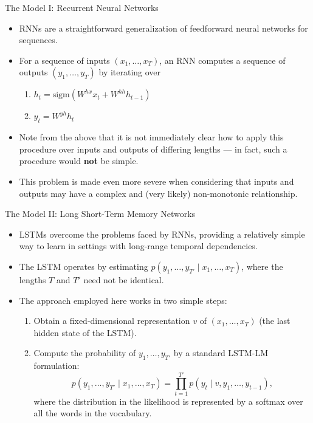 \documentclass{beamer}
\begin{document}

\begin{frame}{The Model I: Recurrent Neural Networks}

\begin{itemize}
  \itemsep10pt
  \item RNNs are a straightforward generalization of feedforward neural networks
    for sequences.
  \item For a sequence of inputs $(x_1, \dots, x_T)$, an RNN computes a sequence
    of outputs $(y_1, \dots, y_T)$ by iterating over
    \begin{enumerate}
      \item $h_t = \text{sigm}(W^{hx}x_t + W^{hh}h_{t-1})$
      \item $y_t = W^{yh}h_t$
    \end{enumerate}
  \item Note from the above that it is not immediately clear how to apply this
    procedure over inputs and outputs of differing lengths --- in fact, such a
    procedure would \textbf{not} be simple.
  \item This problem is made even more severe when considering that inputs and
    outputs may have a complex and (very likely) non-monotonic relationship.
\end{itemize}

\end{frame}


\begin{frame}{The Model II: Long Short-Term Memory Networks}

\begin{itemize}
  \itemsep10pt
  \item LSTMs overcome the problems faced by RNNs, providing a relatively simple
    way to learn in settings with long-range temporal dependencies.
  \item The LSTM operates by estimating $p(y_1, \dots, y_{T'} \mid x_1, \dots,
    x_T)$, where the lengths $T$ and $T'$ need not be identical.
  \item The approach employed here works in two simple steps:
    \begin{enumerate}
      \item Obtain a fixed-dimensional representation $v$ of $(x_1, \dots, x_T)$
        (the last hidden state of the LSTM).
      \item Compute the probability of $y_1, \dots, y_{T'}$ by a standard
        LSTM-LM formulation:
        $$
        p(y_1, \dots, y_{T'} \mid x_1, \dots, x_T) = \prod_{t = 1}^{T'} p(y_t
          \mid v, y_1, \dots, y_{t-1}),
        $$
        where the distribution in the likelihood is represented by a softmax
        over all the words in the vocabulary.
    \end{enumerate}
\end{itemize}

\end{frame}
\end{document}
